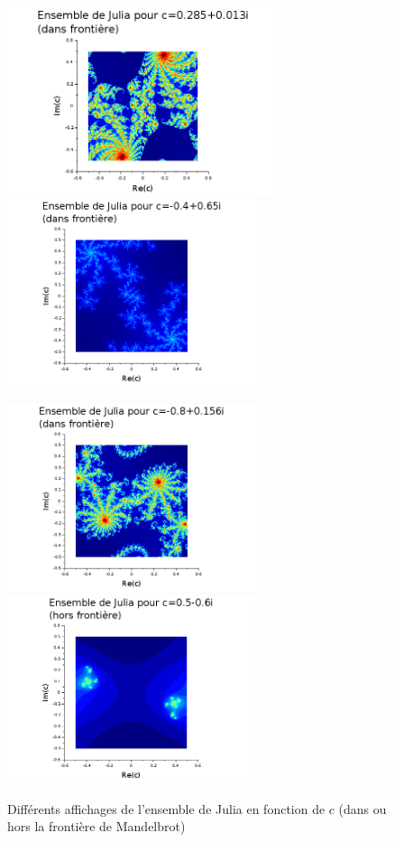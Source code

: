 \documentclass[a4paper,10pt]{report}
\begin{document}
\begin{figure}[H]
\caption{Différents affichages de l'ensemble de Julia en fonction de $c$ (dans ou hors la frontière de Mandelbrot)}
   \begin{minipage}[c]{.49\linewidth}
   \centering
      \includegraphics[height=5.5cm]{julia1_cfM.png}
      \includegraphics[height=5.5cm]{julia2_cfM.png}
   \end{minipage} \hfill
   \begin{minipage}[c]{.49\linewidth}
   \centering
      \includegraphics[height=5.5cm]{julia3_cfM.png}
      \includegraphics[height=5.5cm]{julia4_cfM.png}
   \end{minipage}
\label{affichage_julia_cf_mandelbrot}
\end{figure}
\end{document}
